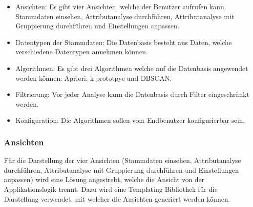 \begin{itemize}
	\item Ansichten: Es gibt vier Ansichten, welche der Benutzer aufrufen kann. Stammdaten einsehen, Attributanalyse durchführen, Attributanalyse mit Gruppierung durchführen und Einstellungen anpassen.
	\item Datentypen der Stammdaten: Die Datenbasis besteht aus Daten, welche verschiedene Datentypen annehmen können.
	\item Algorithmen: Es gibt drei Algorithmen welche auf die Datenbasis angewendet werden können: Apriori, k-prototpye und DBSCAN.
	\item Filtrierung: Vor jeder Analyse kann die Datenbasis durch Filter eingeschränkt werden.
	\item Konfiguration: Die Algorithmen sollen vom Endbenutzer konfigurierbar sein.
\end{itemize}

\subsubsection{Ansichten}
\label{sec:proofofconcept:architektur:anforderungen:ansichten}
Für die Darstellung der vier Ansichten (Stammdaten einsehen, Attributanalyse durchführen, Attributanalyse mit Gruppierung durchführen und Einstellungen anpassen) wird eine Lösung angestrebt, welche die Ansicht von der Applikationslogik trennt. Dazu wird eine Templating Bibliothek für die Darstellung verwendet, mit welcher die Ansichten generiert werden können. 

